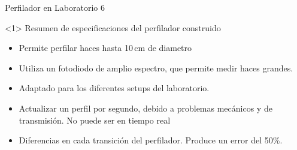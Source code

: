 \begin{frame}{Perfilador en Laboratorio 6}

    
    \begin{onlyenv}<1>
        Resumen de especificaciones del perfilador construido
        \begin{itemize}
            \item Permite perfilar haces hasta 10$\,$cm de diametro 
            \item Utiliza un fotodiodo de amplio espectro, que permite medir haces grandes.
            \item Adaptado para los diferentes setups del laboratorio.
            \item Actualizar un perfil por segundo, debido a problemas mecánicos y de transmisión. No puede ser en tiempo real
            \item Diferencias en cada transición del perfilador. Produce un error del 50\%.
        \end{itemize}
    \end{onlyenv}


\end{frame}
